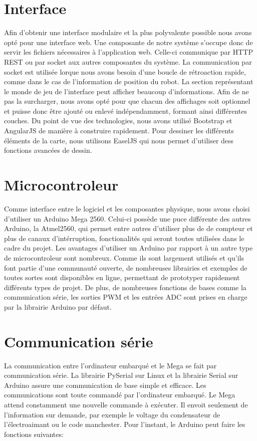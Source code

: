 \section{Interface}
Afin d'obtenir une interface modulaire et la plus polyvalente possible nous avons opté pour une interface web.
Une composante de notre système s'occupe donc de servir les fichiers nécessaires à l'application web.
Celle-ci communique par HTTP REST ou par socket aux autres composantes du système.
La communication par socket est utilisée lorque nous avons besoin d'une boucle de rétroaction rapide,
comme dans le cas de l'information de position du robot.
La section représentant le monde de jeu de l'interface peut afficher beaucoup d'informations.
Afin de ne pas la surcharger, nous avons opté pour que chacun des affichages soit optionnel et puisse donc
être ajouté ou enlevé indépendamment, formant ainsi différentes couches.
Du point de vue des technologies, nous avons utilisé Bootstrap et AngularJS de manière à construire rapidement.
Pour dessiner les différents éléments de la carte, nous utilisons EaselJS qui nous permet d'utiliser dess fonctions avancées de dessin.


\section{Microcontroleur}

Comme interface entre le logiciel et les composantes physique, nous avons choisi d’utiliser un Arduino Mega 2560. Celui-ci possède une puce différente des autres Arduino, la Atmel2560, qui permet entre autres d’utiliser plus de de compteur et plus de canaux d’intérruption, fonctionalités qui seront toutes utilisées dans le cadre du projet. Les avantages d’utiliser un Arduino par rapport à un autre type de microcontroleur sont nombreux. Comme ils sont largement utilisés et qu’ils font partie d’une communauté ouverte, de nombreuses librairies et exemples de toutes sortes sont disponibles en ligne, permettant de prototyper rapidement différents types de projet. De plus, de nombreuses fonctions de bases comme la communication série, les sorties PWM et les entrées ADC sont prises en charge par la librairie Arduino par défaut.

\section{Communication série}

La communication entre l’ordinateur embarqué et le Mega se fait par communication série. La librairie PySerial sur Linux et la librairie Serial sur Arduino assure une communication de base simple et efficace. Les communications sont toute commandé par l’ordinateur embarqué. Le Mega attend constamment une nouvelle commande à exécuter. Il envoit seulement de l’information sur demande, par exemple le voltage du condensateur de l’électroaimant ou le code manchester. Pour l’instant, le Arduino peut faire les fonctions suivantes:

